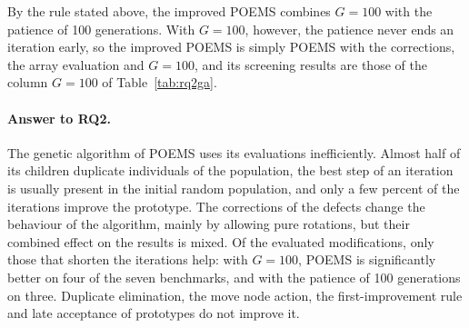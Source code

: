 By the rule stated above, the improved POEMS combines $G = 100$ with the patience of 100 generations. With $G = 100$, however, the patience never ends an iteration early, so the improved POEMS is simply POEMS with the corrections, the array evaluation and $G = 100$, and its screening results are those of the column $G = 100$ of Table~\ref{tab:rq2ga}.

\paragraph{Answer to RQ2.} The genetic algorithm of POEMS uses its evaluations inefficiently. Almost half of its children duplicate individuals of the population, the best step of an iteration is usually present in the initial random population, and only a few percent of the iterations improve the prototype. The corrections of the defects change the behaviour of the algorithm, mainly by allowing pure rotations, but their combined effect on the results is mixed. Of the evaluated modifications, only those that shorten the iterations help: with $G = 100$, POEMS is significantly better on four of the seven benchmarks, and with the patience of 100 generations on three. Duplicate elimination, the move node action, the first-improvement rule and late acceptance of prototypes do not improve it.
